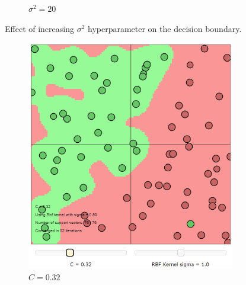 \documentclass{article}
\begin{document}
\begin{figure}[h]
\begin{subfigure}[b]{0.3\textwidth}
                 \caption{$\sigma^2 = 20$}
                 \label{fig:high_sigma}
             \end{subfigure}
            \caption{Effect of increasing $\sigma^2$ hyperparameter on the decision boundary.}
        \end{figure}
        
        \begin{figure}[h]
             \centering
             \hspace{0.15\textwidth}
             \begin{subfigure}[b]{0.3\textwidth}
                 \centering
                 \includegraphics[width=\textwidth]{Assignment 1/figures/RBF_low_regularisation.png}
                 \caption{$C = 0.32$}
                 \label{fig:rbf_low_regularisation}
             \end{subfigure}
             \hfill
             \begin{subfigure}[b]{0.3\textwidth}
                 \centering

\end{subfigure}
\end{figure}
\end{document}
